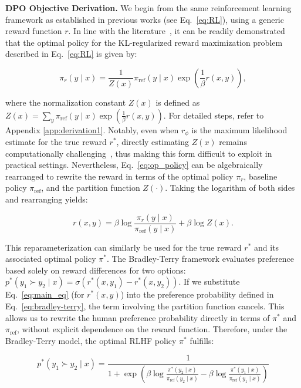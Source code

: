 \textbf{DPO Objective Derivation.} We begin from the same reinforcement learning framework as established in previous works (see Eq.~\ref{eq:RL}), using a generic reward function $r$. In line with the literature~\citep{peters2007reinforcement, peng2019advantage, korbak2022reinforcement, go2023aligning}, it can be readily demonstrated that the optimal policy for the KL-regularized reward maximization problem described in Eq.~\ref{eq:RL} is given by:

\begin{equation}\label{eq:op_policy}
    \pi_r(y\mid x) = \frac{1}{Z(x)}\pi_\text{ref}(y\mid x)\exp\left(\frac{1}{\beta}r(x, y)\right),
\end{equation}

where the normalization constant $Z(x)$ is defined as $Z(x) =\sum_{y}\pi_\text{ref}(y\mid x)\exp\left(\frac{1}{\beta}r(x, y)\right)$. For detailed steps, refer to Appendix \ref{app:derivation1}. Notably, even when $r_\phi$ is the maximum likelihood estimate for the true reward $r^*$, directly estimating $Z(x)$ remains computationally challenging~\citep{korbak2022reinforcement, go2023aligning}, thus making this form difficult to exploit in practical settings. Nevertheless, Eq.~\ref{eq:op_policy} can be algebraically rearranged to rewrite the reward in terms of the optimal policy $\pi_r$, baseline policy $\pi_\text{ref}$, and the partition function $Z(\cdot)$. Taking the logarithm of both sides and rearranging yields:

\begin{equation}\label{eq:main_eq}
    r(x,y) =\beta \log \frac{\pi_r(y\mid x)}{\pi_\text{ref}(y\mid x)} + \beta \log Z(x).
\end{equation}

This reparameterization can similarly be used for the true reward $r^*$ and its associated optimal policy $\pi^*$. The Bradley-Terry framework evaluates preference based solely on reward differences for two options: ${p^*(y_1 \succ y_2 \mid x) = \sigma(r^*(x, y_1) - r^*(x, y_2))}$. If we substitute Eq.~\ref{eq:main_eq} (for $r^*(x,y)$) into the preference probability defined in Eq.~\ref{eq:bradley-terry}, the term involving the partition function cancels. This allows us to rewrite the human preference probability directly in terms of $\pi^*$ and $\pi_\text{ref}$, without explicit dependence on the reward function. Therefore, under the Bradley-Terry model, the optimal RLHF policy $\pi^*$ fulfills:

\begin{equation}\label{eq:objective}
    p^*(y_1\succ y_2 \mid x)=\frac{1}{1 + \exp\left(\beta \log \frac{\pi^*(y_2\mid x)}{\pi_\text{ref}(y_2\mid x)} - \beta \log \frac{\pi^*(y_1\mid x)}{\pi_\text{ref}(y_1\mid x)}\right)}
\end{equation}

